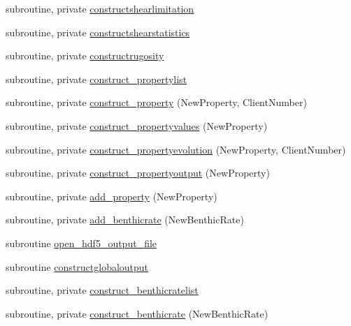 \begin{DoxyCompactItemize}
subroutine, private \mbox{\hyperlink{namespacemoduleinterfacesedimentwater_a2072a215e8db4306324a2b30c102ae15}{constructshearlimitation}}
\item 
subroutine, private \mbox{\hyperlink{namespacemoduleinterfacesedimentwater_a791c68b5d42b6f1a6b1fe8183420147b}{constructshearstatistics}}
\item 
subroutine, private \mbox{\hyperlink{namespacemoduleinterfacesedimentwater_ae92e82b3ef714cf8b3516fa5e25469d3}{constructrugosity}}
\item 
subroutine, private \mbox{\hyperlink{namespacemoduleinterfacesedimentwater_a1db436f609ed9890367a1345dba195c0}{construct\+\_\+propertylist}}
\item 
subroutine, private \mbox{\hyperlink{namespacemoduleinterfacesedimentwater_a7388cf4b98f85f5b8bc80f3e59724650}{construct\+\_\+property}} (New\+Property, Client\+Number)
\item 
subroutine, private \mbox{\hyperlink{namespacemoduleinterfacesedimentwater_a9e41247ffadd3cbbaf6315c7a890f885}{construct\+\_\+propertyvalues}} (New\+Property)
\item 
subroutine, private \mbox{\hyperlink{namespacemoduleinterfacesedimentwater_a6336ff1fc78b8fe728b00770c5b311b0}{construct\+\_\+propertyevolution}} (New\+Property, Client\+Number)
\item 
subroutine, private \mbox{\hyperlink{namespacemoduleinterfacesedimentwater_a63417d4ba89dc1cc869efface42ddc8a}{construct\+\_\+propertyoutput}} (New\+Property)
\item 
subroutine, private \mbox{\hyperlink{namespacemoduleinterfacesedimentwater_aa06e726d01ab265942552440a00f80f8}{add\+\_\+property}} (New\+Property)
\item 
subroutine, private \mbox{\hyperlink{namespacemoduleinterfacesedimentwater_a9d88824cf037c2b56b53fc58c3274259}{add\+\_\+benthicrate}} (New\+Benthic\+Rate)
\item 
subroutine \mbox{\hyperlink{namespacemoduleinterfacesedimentwater_a4426ad3ca86030e07e39188a538bdca8}{open\+\_\+hdf5\+\_\+output\+\_\+file}}
\item 
subroutine \mbox{\hyperlink{namespacemoduleinterfacesedimentwater_ac6a2892e7ef45d76ecf31efda1d69f96}{constructglobaloutput}}
\item 
subroutine, private \mbox{\hyperlink{namespacemoduleinterfacesedimentwater_a4713df4000135a16a6b464063f75fe72}{construct\+\_\+benthicratelist}}
\item 
subroutine, private \mbox{\hyperlink{namespacemoduleinterfacesedimentwater_ab413235c8b7ada790b2fdaa8d3598925}{construct\+\_\+benthicrate}} (New\+Benthic\+Rate)

\end{DoxyCompactItemize}
